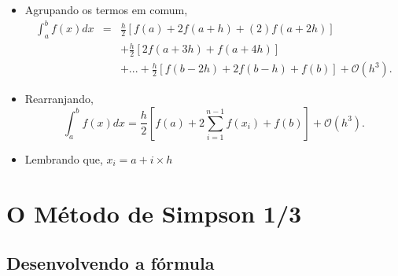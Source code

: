 \documentclass[xcolor=table]{beamer}
\newenvironment{stepitemize}{\begin{itemize}[<+->]}{\end{itemize} }
\begin{document}
\begin{frame}%

\begin{stepitemize}
\item Agrupando os termos em comum,%
\begin{eqnarray*}
\int_{a}^{b}f\left( x\right) dx &=&\frac{h}{2}\left[ f\left( a\right)
+2f\left( a+h\right) +\left( 2\right) f\left( a+2h\right) \right]  \\
&&+\frac{h}{2}\left[ 2f\left( a+3h\right) +f\left( a+4h\right) \right]  \\
&&+...+\frac{h}{2}\left[ f\left( b-2h\right) +2f\left( b-h\right) +f\left(
b\right) \right] +\mathcal{O}\left( h^{3}\right) .
\end{eqnarray*}

\item Rearranjando,%
\[
\int_{a}^{b}f\left( x\right) dx=\frac{h}{2}\left[ f\left( a \right)
+2\sum_{i=1}^{n-1}f\left( x_{i}\right) +f\left( b \right) \right] + \mathcal{O}\left( h^{3} \right) .
\]

\item Lembrando que, $x_{i}=a+i\times h$
\end{stepitemize}

\transboxout%
\end{frame}%

\section{O M\'{e}todo de Simpson 1/3}

\subsection{Desenvolvendo a f\'{o}rmula}
\end{document}
